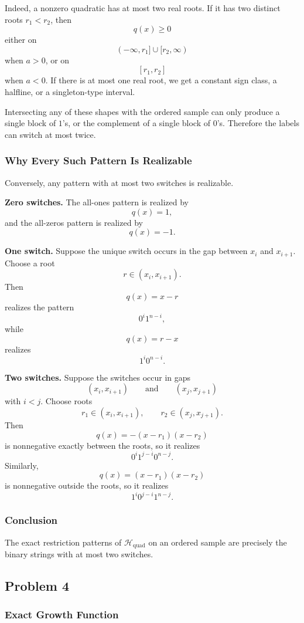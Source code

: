 \documentclass{article}
\begin{document}
Indeed, a nonzero quadratic has at most two real roots. If it has two distinct roots $r_1 < r_2$, then
$$
q(x) \ge 0
$$
either on
$$
(-\infty,r_1] \cup [r_2,\infty)
$$
when $a>0$, or on
$$
[r_1,r_2]
$$
when $a<0$. If there is at most one real root, we get a constant sign class, a halfline, or a singleton-type interval.

Intersecting any of these shapes with the ordered sample can only produce a single block of $1$'s, or the complement of a single block of $0$'s. Therefore the labels can switch at most twice.

\subsubsection{Why Every Such Pattern Is Realizable}

Conversely, any pattern with at most two switches is realizable.

\textbf{Zero switches.}
The all-ones pattern is realized by
$$
q(x) = 1,
$$
and the all-zeros pattern is realized by
$$
q(x) = -1.
$$

\textbf{One switch.}
Suppose the unique switch occurs in the gap between $x_i$ and $x_{i+1}$. Choose a root
$$
r \in (x_i,x_{i+1}).
$$
Then
$$
q(x) = x-r
$$
realizes the pattern
$$
0^i1^{n-i},
$$
while
$$
q(x) = r-x
$$
realizes
$$
1^i0^{n-i}.
$$

\textbf{Two switches.}
Suppose the switches occur in gaps
$$
(x_i,x_{i+1})
\qquad \text{and} \qquad
(x_j,x_{j+1})
$$
with $i<j$. Choose roots
$$
r_1 \in (x_i,x_{i+1}),
\qquad
r_2 \in (x_j,x_{j+1}).
$$
Then
$$
q(x) = -(x-r_1)(x-r_2)
$$
is nonnegative exactly between the roots, so it realizes
$$
0^i1^{j-i}0^{n-j}.
$$
Similarly,
$$
q(x) = (x-r_1)(x-r_2)
$$
is nonnegative outside the roots, so it realizes
$$
1^i0^{j-i}1^{n-j}.
$$

\subsubsection{Conclusion}

The exact restriction patterns of $\mathcal{H}_{\mathrm{quad}}$ on an ordered sample are precisely the binary strings with at most two switches.

\subsection{Problem 4}

\subsubsection{Exact Growth Function}
\end{document}
